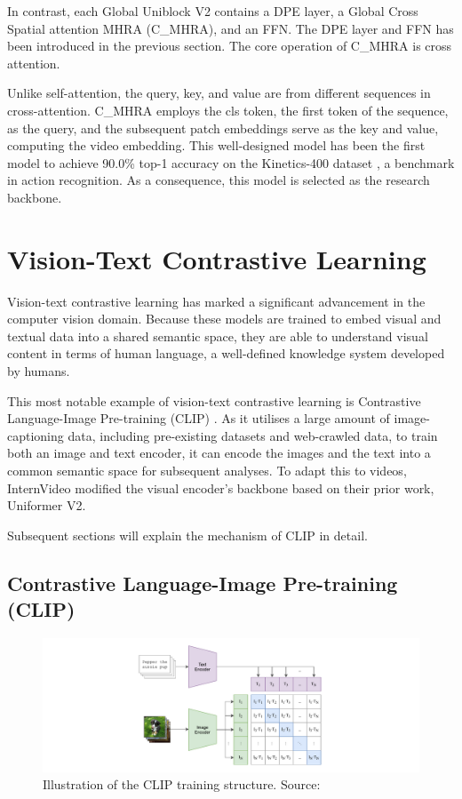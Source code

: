 In contrast, each Global Uniblock V2 contains a DPE layer, a Global Cross Spatial attention MHRA (C\_MHRA), and an FFN. The DPE layer and FFN has been introduced in the previous section. The core operation of C\_MHRA is cross attention. 

Unlike self-attention, the query, key, and value are from different sequences in cross-attention. C\_MHRA employs the cls token, the first token of the sequence, as the query, and the subsequent patch embeddings serve as the key and value, computing the video embedding. This well-designed model has been the first model to achieve 90.0\% top-1 accuracy on the Kinetics-400 \parencite{kay2017kinetics} dataset \parencite{li2022uniformerv2}, a benchmark in action recognition. As a consequence, this model is selected as the research backbone.

\section{Vision-Text Contrastive Learning}
Vision-text contrastive learning has marked a significant advancement in the computer vision domain. Because these models are trained to embed visual and textual data into a shared semantic space, they are able to understand visual content in terms of human language, a well-defined knowledge system developed by humans. 

This most notable example of vision-text contrastive learning is Contrastive Language-Image Pre-training (CLIP) \parencite{radford2021learning}. As it utilises a large amount of image-captioning data, including pre-existing datasets and web-crawled data, to train both an image and text encoder, it can encode the images and the text into a common semantic space for subsequent analyses. To adapt this to videos, InternVideo modified the visual encoder's backbone \parencite{wang2022internvideo} based on their prior work, Uniformer V2.

Subsequent sections will explain the mechanism of CLIP in detail.

\subsection{Contrastive Language-Image Pre-training (CLIP)}
\begin{figure}[ht]
    \centering
    \includegraphics[width=1.0\textwidth]{assets/charts_rw/CLIP_loss}
    \caption[Training Structure of CLIP]{Illustration of the CLIP training structure. Source: \parencite{radford2021learning}}
    \label{fig:cliplossstructure}
\end{figure}


